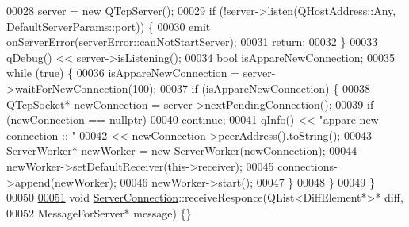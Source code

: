 \begin{DoxyCode}
00028   server = \textcolor{keyword}{new} QTcpServer();
00029   \textcolor{keywordflow}{if} (!server->listen(QHostAddress::Any, DefaultServerParams::port)) \{
00030     emit onServerError(serverError::canNotStartServer);
00031     \textcolor{keywordflow}{return};
00032   \}
00033   qDebug() << server->isListening();
00034   \textcolor{keywordtype}{bool} isAppareNewConnection;
00035   \textcolor{keywordflow}{while} (\textcolor{keyword}{true}) \{
00036     isAppareNewConnection = server->waitForNewConnection(100);
00037     \textcolor{keywordflow}{if} (isAppareNewConnection) \{
00038       QTcpSocket* newConnection = server->nextPendingConnection();
00039       \textcolor{keywordflow}{if} (newConnection == nullptr)
00040         \textcolor{keywordflow}{continue};
00041       qInfo() << \textcolor{stringliteral}{"appare new connection  :: "}
00042               << newConnection->peerAddress().toString();
00043       \hyperlink{a00185_ab80ef665f93d81c71a83aa42f8d888df}{ServerWorker}* newWorker = \textcolor{keyword}{new} ServerWorker(newConnection);
00044       newWorker->setDefaultReceiver(\textcolor{keyword}{this}->receiver);
00045       connections->append(newWorker);
00046       newWorker->start();
00047     \}
00048   \}
00049 \}
00050 
\hyperlink{a00181_afd1dd14f38c6c1d1efa719af1a9d9851}{00051} \textcolor{keywordtype}{void} \hyperlink{a00181_af558fe509b60eb019281316513f6d188}{ServerConnection}::receiveResponce(QList<DiffElement*>* diff,
00052                                        MessageForServer* message) \{\}
\end{DoxyCode}

